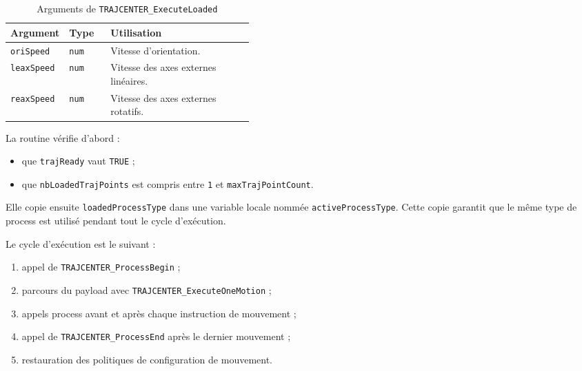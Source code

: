 \documentclass{rapportENSAM}
\begin{document}
\begin{table}[ht]
    \centering
    \begin{tabularx}{\linewidth}{
        |p{0.24\linewidth}
        |p{0.17\linewidth}
        |X|
    }
        \hline
        \textbf{Argument} &
        \textbf{Type} &
        \textbf{Utilisation} \\
        \hline

        \texttt{oriSpeed} &
        \texttt{num} &
        Vitesse d'orientation. \\
        \hline

        \texttt{leaxSpeed} &
        \texttt{num} &
        Vitesse des axes externes linéaires. \\
        \hline

        \texttt{reaxSpeed} &
        \texttt{num} &
        Vitesse des axes externes rotatifs. \\
        \hline
    \end{tabularx}
    \caption{Arguments de \texttt{TRAJCENTER\_ExecuteLoaded}}
    \label{tab:rapid-exec-noproc-arguments}
\end{table}

La routine vérifie d'abord :

\begin{itemize}
    \item que \texttt{trajReady} vaut \texttt{TRUE} ;
    \item que \texttt{nbLoadedTrajPoints} est compris entre
    \texttt{1} et \texttt{maxTrajPointCount}.
\end{itemize}

Elle copie ensuite \texttt{loadedProcessType} dans une variable locale nommée
\texttt{activeProcessType}. Cette copie garantit que le même type de process
est utilisé pendant tout le cycle d'exécution.

Le cycle d'exécution est le suivant :

\begin{enumerate}
    \item appel de \texttt{TRAJCENTER\_ProcessBegin} ;
    \item parcours du payload avec
    \texttt{TRAJCENTER\_ExecuteOneMotion} ;
    \item appels process avant et après chaque instruction de mouvement ;
    \item appel de \texttt{TRAJCENTER\_ProcessEnd} après le dernier mouvement ;
    \item restauration des politiques de configuration de mouvement.
\end{enumerate}
\end{document}
